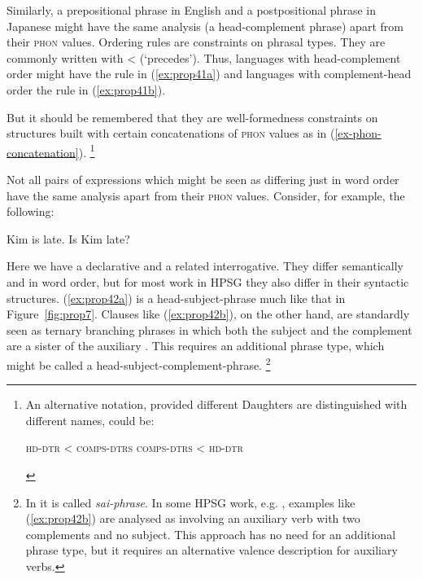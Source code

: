 \documentclass[output=paper
	        ,collection
	        ,collectionchapter
 	        ,biblatex
                ,babelshorthands
                ,newtxmath
                ,draftmode
                ,colorlinks, citecolor=brown
]{langscibook}
\begin{document}
Similarly, a prepositional phrase in English and a postpositional phrase in Japanese might have the same analysis (a head-complement phrase) apart from their \textsc{phon} values. Ordering rules are constraints on phrasal types. They are commonly written with < (`precedes'). Thus, languages with head-complement order might have the rule in (\ref{ex:prop41a}) and languages with complement-head order the rule in (\ref{ex:prop41b}).

\eal\label{ex:prop41}
\ex\label{ex:prop41a}
\ex\label{ex:prop41b}
\zl

But it should be remembered that they are well-formedness constraints on structures built with certain concatenations of \textsc{phon} values as in (\ref{ex-phon-concatenation}).%
%
\footnote{An alternative notation, provided different Daughters are distinguished with different names, could be:
\begin{exe}
	 \textsc{hd-dtr} < \textsc{comps-dtrs}
	 \textsc{comps-dtrs} < \textsc{hd-dtr}
\end{exe}
}
%

Not all pairs of expressions which might be seen as differing just in word order have the same analysis apart from their \textsc{phon} values. Consider, for example, the following:

\ea\label{ex:prop42}
	\ea\label{ex:prop42a}
	Kim is late.
	\ex\label{ex:prop42b}
	Is Kim late?
	\z
\z

Here we have a declarative and a related interrogative. They differ semantically and in word order, but for most work in HPSG they also differ in their syntactic structures. (\ref{ex:prop42a}) is a head-subject-phrase much like that in Figure~\ref{fig:prop7}. Clauses like (\ref{ex:prop42b}), on the other hand, are standardly seen as ternary branching phrases in which both the subject and the complement are a sister of the auxiliary \citep[40]{ps2}. This requires an additional phrase type, which might be called a head-subject-complement-phrase.%
%
\footnote{In \citet[36]{GSag2000a-u} it is called \emph{sai-phrase}. In some HPSG work, e.g. \citet[409--414]{SWB2003a}, examples like (\ref{ex:prop42b}) are analysed as involving an auxiliary verb with two complements and no subject. This approach has no need for an additional phrase type, but it requires an alternative valence description for auxiliary verbs.}
%
\end{document}
